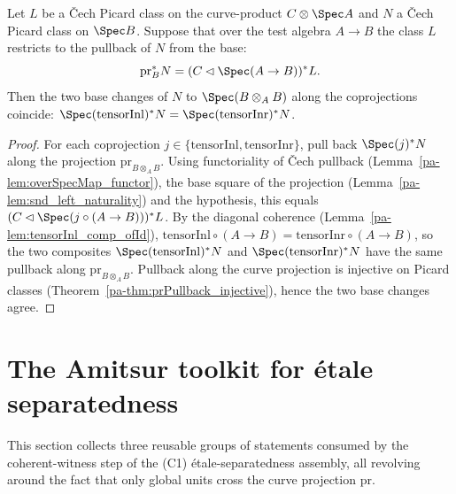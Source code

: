 \begin{theorem}
  \label{pa-thm:cechPicMap_tensorInl_eq_tensorInr}
  \leanok

  Let \(L\) be a \v Cech Picard class on the curve-product \(C \otimes \Spec A\) and \(N\) a \v
  Cech Picard class on \(\Spec B\).  Suppose that over the test algebra \(A \to B\) the class
  \(L\) restricts to the pullback of \(N\) from the base:
  \[
    \mathrm{pr}_B^{*} N = (C \lhd \Spec(A \to B))^{*} L.
  \]
  Then the two base changes of \(N\) to \(\Spec(B \otimes_A B)\) along the coprojections
  coincide:
  \(\Spec(\mathrm{tensorInl})^{*} N = \Spec(\mathrm{tensorInr})^{*} N\).
\end{theorem}
\begin{proof}
  \leanok
  For each coprojection \(j \in \{\mathrm{tensorInl}, \mathrm{tensorInr}\}\), pull back
  \(\Spec(j)^{*} N\) along the projection \(\mathrm{pr}_{B \otimes_A B}\).  Using functoriality
  of \v Cech pullback (Lemma~\ref{pa-lem:overSpecMap_functor}), the base square of the projection
  (Lemma~\ref{pa-lem:snd_left_naturality}) and the hypothesis, this equals \((C \lhd \Spec(j
  \circ (A \to B)))^{*} L\).  By the diagonal coherence
  (Lemma~\ref{pa-lem:tensorInl_comp_ofId}), \(\mathrm{tensorInl} \circ (A \to B) = \mathrm{tensorInr}
  \circ (A \to B)\), so the two composites \(\Spec(\mathrm{tensorInl})^{*} N\) and
  \(\Spec(\mathrm{tensorInr})^{*} N\) have the same pullback along \(\mathrm{pr}_{B \otimes_A
  B}\).  Pullback along the curve projection is injective on Picard classes
  (Theorem~\ref{pa-thm:prPullback_injective}), hence the two base changes agree.
\end{proof}

\section{The Amitsur toolkit for \'etale separatedness}
\label{pa-sec:amitsurCochain}

This section collects three reusable groups of statements consumed by the coherent-witness
step of the (C1) \'etale-separatedness assembly, all revolving around the fact that only global
units cross the curve projection \(\mathrm{pr}\).

